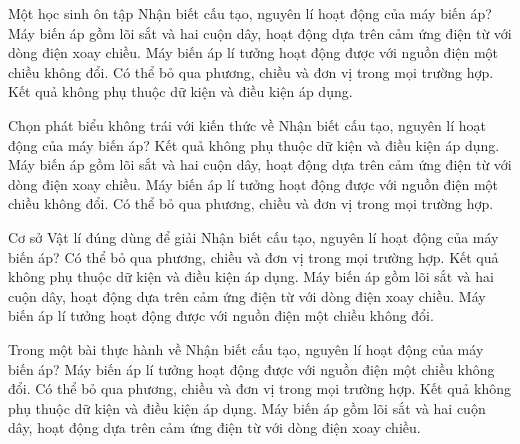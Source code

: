 \begin{ex}
Một học sinh ôn tập Nhận biết cấu tạo, nguyên lí hoạt động của máy biến áp?
\choice
{\True Máy biến áp gồm lõi sắt và hai cuộn dây, hoạt động dựa trên cảm ứng điện từ với dòng điện xoay chiều.}
{Máy biến áp lí tưởng hoạt động được với nguồn điện một chiều không đổi.}
{Có thể bỏ qua phương, chiều và đơn vị trong mọi trường hợp.}
{Kết quả không phụ thuộc dữ kiện và điều kiện áp dụng.}
\end{ex}

\begin{ex}
Chọn phát biểu không trái với kiến thức về Nhận biết cấu tạo, nguyên lí hoạt động của máy biến áp?
\choice
{Kết quả không phụ thuộc dữ kiện và điều kiện áp dụng.}
{\True Máy biến áp gồm lõi sắt và hai cuộn dây, hoạt động dựa trên cảm ứng điện từ với dòng điện xoay chiều.}
{Máy biến áp lí tưởng hoạt động được với nguồn điện một chiều không đổi.}
{Có thể bỏ qua phương, chiều và đơn vị trong mọi trường hợp.}
\end{ex}

\begin{ex}
Cơ sở Vật lí đúng dùng để giải Nhận biết cấu tạo, nguyên lí hoạt động của máy biến áp?
\choice
{Có thể bỏ qua phương, chiều và đơn vị trong mọi trường hợp.}
{Kết quả không phụ thuộc dữ kiện và điều kiện áp dụng.}
{\True Máy biến áp gồm lõi sắt và hai cuộn dây, hoạt động dựa trên cảm ứng điện từ với dòng điện xoay chiều.}
{Máy biến áp lí tưởng hoạt động được với nguồn điện một chiều không đổi.}
\end{ex}

\begin{ex}
Trong một bài thực hành về Nhận biết cấu tạo, nguyên lí hoạt động của máy biến áp?
\choice
{Máy biến áp lí tưởng hoạt động được với nguồn điện một chiều không đổi.}
{Có thể bỏ qua phương, chiều và đơn vị trong mọi trường hợp.}
{Kết quả không phụ thuộc dữ kiện và điều kiện áp dụng.}
{\True Máy biến áp gồm lõi sắt và hai cuộn dây, hoạt động dựa trên cảm ứng điện từ với dòng điện xoay chiều.}
\end{ex}

